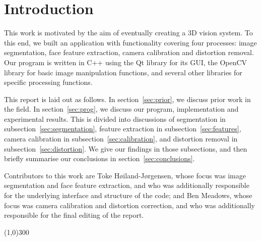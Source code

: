 
\section{Introduction}

This work is motivated by the aim of eventually creating a 3D vision system. To this end, we built an application with functionality covering four processes: image segmentation, face feature extraction, camera calibration and distortion removal. Our program is written in C++ using the Qt library for its GUI, the OpenCV library for basic image manipulation functions, and several other libraries for specific processing functions.

This report is laid out as follows. In section~\ref{sec:prior}, we discuss prior work in the field. In section~\ref{sec:prog}, we discuss our program, implementation and experimental results. This is divided into discussions of segmentation in subsection~\ref{sec:segmentation}, feature extraction in subsection~\ref{sec:features}, camera calibration in subsection~\ref{sec:calibration}, and distortion removal in subsection~\ref{sec:distortion}. We give our findings in those subsections, and then briefly summarise our conclusions in section~\ref{sec:conclusions}.

Contributors to this work are Toke Høiland-Jørgensen, whose focus was image segmentation and face feature extraction, and who was additionally responsible for the underlying interface and structure of the code; and Ben Meadows, whose focus was camera calibration and distortion correction, and who was additionally responsible for the final editing of the report.

\begin{center}
\line(1,0){300}
\end{center}